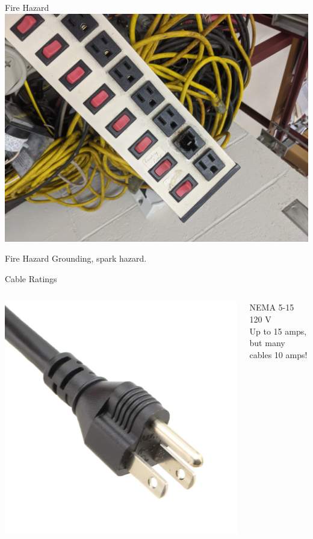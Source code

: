 \documentclass{presentation}
\begin{document}
\begin{frame}{Fire Hazard}
  \includegraphics[width=\textwidth]{"./PXL_20201216_221308084.jpg"}
\end{frame}

\begin{frame}{Fire Hazard}
  Grounding, spark hazard.
\end{frame}

\begin{frame}{Cable Ratings}
  \begin{columns}
    \begin{column}{0.33\textwidth}
      \includegraphics[width=\textwidth]{"./5-15.jpg"}
    \end{column}
    \begin{column}{0.67\textwidth}
      NEMA 5-15
      \\
      120 V
      \\
      Up to 15 amps, but many cables 10 amps!
    \end{column}
  \end{columns}
\end{frame}
\end{document}
